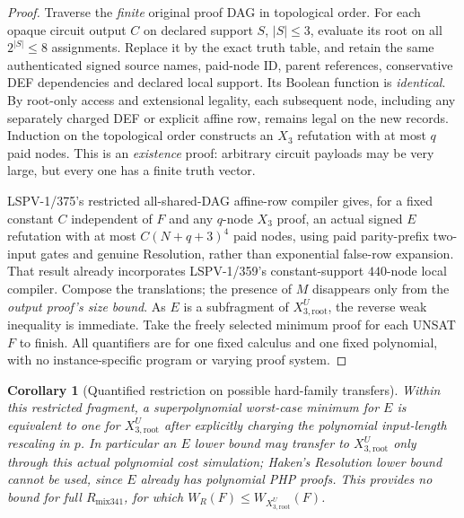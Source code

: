 \documentclass[11pt]{article}
\newtheorem{corollary}[theorem]{Corollary}
\begin{document}
\begin{proof}
Traverse the \emph{finite} original proof DAG in topological order. For each opaque circuit output $C$ on declared support $S$, $|S|\le3$, evaluate its root on all $2^{|S|}\le8$ assignments. Replace it by the exact truth table, and retain the same authenticated signed source names, paid-node ID, parent references, conservative DEF dependencies and declared local support. Its Boolean function is \emph{identical}. By root-only access and extensional legality, each subsequent node, including any separately charged DEF or explicit affine row, remains legal on the new records. Induction on the topological order constructs an $X_3$ refutation with at most $q$ paid nodes. This is an \emph{existence} proof: arbitrary circuit payloads may be very large, but every one has a finite truth vector.

LSPV-1/375's restricted all-shared-DAG affine-row compiler gives, for a fixed constant $C$ independent of $F$ and any $q$-node $X_3$ proof, an actual signed $E$ refutation with at most $C(N+q+3)^4$ paid nodes, using paid parity-prefix two-input gates and genuine Resolution, rather than exponential false-row expansion. That result already incorporates LSPV-1/359's constant-support $440$-node local compiler. Compose the translations; the presence of $M$ disappears only from the \emph{output proof's size bound}. As $E$ is a subfragment of $X_{3,\mathrm{root}}^U$, the reverse weak inequality is immediate. Take the freely selected minimum proof for each UNSAT $F$ to finish. All quantifiers are for one fixed calculus and one fixed polynomial, with no instance-specific program or varying proof system.
\end{proof}

\begin{corollary}[Quantified restriction on possible hard-family transfers]
Within this restricted fragment, a superpolynomial worst-case minimum for $E$ is equivalent to one for $X_{3,\mathrm{root}}^U$ after explicitly charging the polynomial input-length rescaling in $p$. In particular an $E$ lower bound may transfer to $X_{3,\mathrm{root}}^U$ only through this \emph{actual polynomial cost simulation}; Haken's Resolution lower bound cannot be used, since $E$ already has polynomial PHP proofs. This provides no bound for full $R_{\mathrm{mix341}}$, for which $W_R(F)\le W_{X_{3,\mathrm{root}}^U}(F)$.
\end{corollary}
\end{document}
